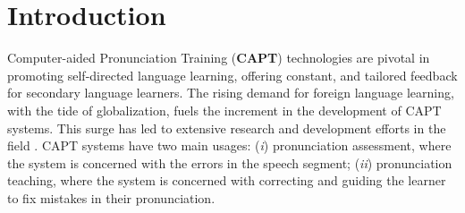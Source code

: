 \documentclass[11pt]{article}
\begin{document}

\section{Introduction}

Computer-aided Pronunciation Training (\textbf{CAPT}) technologies are pivotal in promoting self-directed language learning, offering constant, and tailored feedback for secondary language learners. The rising demand for foreign language learning, with the tide of globalization, fuels the increment in the development of CAPT systems. This surge has led to extensive research and development efforts in the field \cite{CAPT_2, kang2018routledge, CAPT}.
CAPT systems have two main usages: 
(\textit{i}) pronunciation assessment, where the system is concerned with the errors in the speech segment; %
(\textit{ii}) pronunciation teaching, where the 
system is concerned with correcting and guiding the learner to fix mistakes in their pronunciation.
\end{document}

